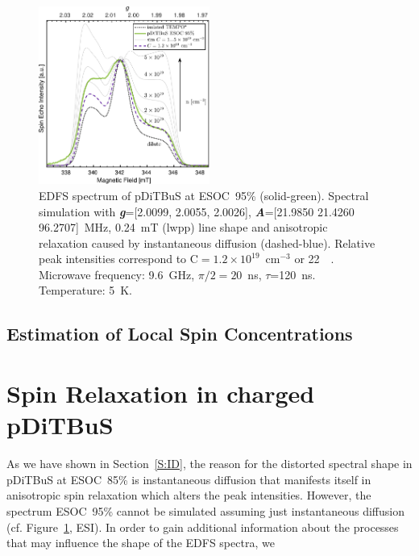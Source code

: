 \begin{figure}[ht!]
  \centering
	\includegraphics[width=0.5\textwidth]{./pulse/figures/Figure_S24.pdf}
	\caption{EDFS spectrum of pDiTBuS at ESOC~95\% (solid-green). Spectral simulation with \textit{\textbf{g}}=[2.0099, 2.0055, 2.0026], \textit{\textbf{A}}=[21.9850 21.4260 96.2707]~MHz, 0.24~mT (lwpp)  line shape and anisotropic relaxation caused by instantaneous diffusion (dashed-blue). Relative peak intensities correspond to C$=1.2\times10^{19}$~cm$^{-3}$ or 22~\si{\milli\Molar}. Microwave frequency: 9.6~GHz, $\pi/2=20$~ns, $\tau$=120~ns. Temperature: 5~K.}
	\label{fig:Figure_S_SIM_FSE_SOC95_ID}
\end{figure}

\newpage




\subsection{Estimation of Local Spin Concentrations}



\section{Spin Relaxation in charged pDiTBuS}
\label{S:RELAX_TIMES}

As we have shown in Section~\ref{S:ID}, the reason for the distorted spectral shape in pDiTBuS at ESOC~85\% is instantaneous diffusion that manifests itself in anisotropic spin relaxation which alters the  peak intensities. However, the spectrum  ESOC~95\% cannot be simulated assuming just instantaneous diffusion (cf. Figure~\ref{fig:Figure_S_SIM_FSE_SOC95_ID}, ESI). In order to gain additional information about the processes that may influence the shape of the EDFS spectra, we \\

